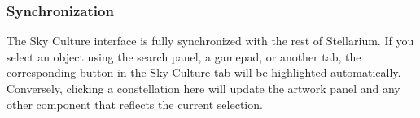 \subsubsection{Synchronization}
\label{sec:SkyCulture:Sync}

The Sky Culture interface is fully synchronized with the rest of Stellarium. If you select an object using the search panel, a gamepad, or another tab, the corresponding button in the Sky Culture tab will be highlighted automatically. Conversely, clicking a constellation here will update the artwork panel and any other component that reflects the current selection.